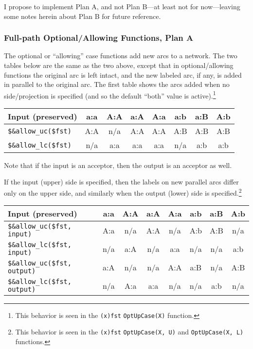 \documentclass[letterpaper,12pt]{article}
\begin{document}
I propose to implement Plan A, and not Plan B---at least not for
now---leaving some notes herein about
Plan B for future reference.

\subsubsection{Full-path Optional/Allowing Functions, Plan A}

The optional or ``allowing'' case functions add new arcs to a network.  The
two tables below are the same as the two above, except that in
optional/allowing functions the
original arc is left intact, and the new labeled arc, if any, is added in
parallel to the original arc.  The first table shows the arcs added when no
side/projection is specified (and so the default ``both'' value is
active).\footnote{This behavior is seen in the \texttt{(x)fst}
\texttt{OptUpCase(X)} function.}

\vspace{.5cm}
\noindent
\begin{tabular}{|l|c|c|c|c|c|c|c|}
\hline
Input (preserved)        & a:a & A:A & a:A & A:a & a:b & a:B & A:b \\
\hline
\verb/$&allow_uc($fst)/  & A:A & n/a & A:A & A:A & A:B & A:B & A:B \\
\hline
\verb/$&allow_lc($fst)/  & n/a & a:a & a:a & a:a & n/a & a:b & a:b \\
\hline
\end{tabular}
\vspace{.5cm}

\noindent
Note that if the input is an acceptor, then the output is an acceptor as
well.

If the input (upper) side is specified, then the labels on new parallel arcs differ
only on the upper side, and
similarly when the output (lower) side is specified.\footnote{This
behavior is seen in the \texttt{(x)fst} \texttt{OptUpCase(X, U)} and
\texttt{OptUpCase(X, L)} functions.}

\vspace{.5cm}
\noindent
\begin{tabular}{|l|c|c|c|c|c|c|c|}
\hline
Input (preserved)               & a:a & A:A & a:A & A:a & a:b & a:B & A:b \\
\hline
\verb/$&allow_uc($fst, input)/  & A:a & n/a & A:A & n/a & A:b & A:B & n/a \\
\hline
\verb/$&allow_lc($fst, input)/  & n/a & a:A & n/a & a:a & n/a & n/a & a:b \\
\hline
\verb/$&allow_uc($fst, output)/  & a:A & n/a & n/a & A:A & a:B & n/a & A:B \\
\hline
\verb/$&allow_lc($fst, output)/  & n/a & A:a & a:a & n/a & n/a & a:b & n/a \\
\hline
\end{tabular}
\vspace{.5cm}
\end{document}
